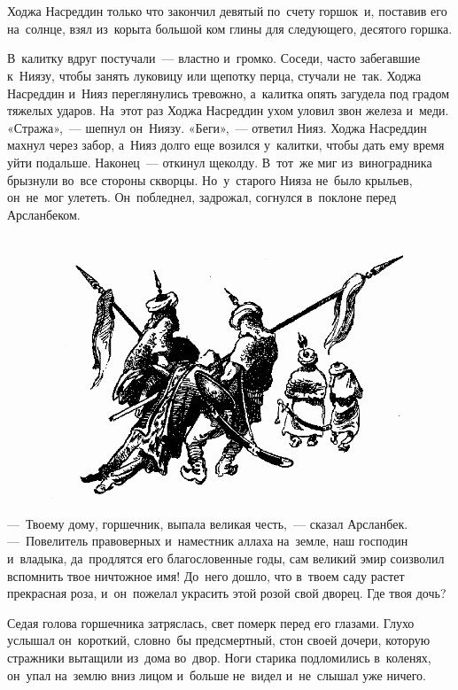 \documentclass[12pt,a4paper]{book}
\begin{document}
\chapter{}

Ходжа Насреддин только что закончил девятый по~счету горшок~и, поставив его на~солнце, взял из~корыта большой ком глины для следующего, десятого горшка.

В~калитку вдруг постучали~— властно и~громко. Соседи, часто забегавшие к~Ниязу, чтобы занять луковицу или щепотку перца, стучали не~так. Ходжа Насреддин и~Нияз переглянулись тревожно, а~калитка опять загудела под градом тяжелых ударов. На~этот раз Ходжа Насреддин ухом уловил звон железа и~меди. «Стража»,~— шепнул он~Ниязу. «Беги»,~— ответил Нияз. Ходжа Насреддин махнул через забор, а~Нияз долго еще возился у~калитки, чтобы дать ему время уйти подальше. Наконец~— откинул щеколду. В~тот~же миг из~виноградника брызнули во~все стороны скворцы. Но~у~старого Нияза не~было крыльев, он~не~мог улететь. Он~побледнел, задрожал, согнулся в~поклоне перед Арсланбеком.

\begin{figure}[h]
\centering
\includegraphics[width=\textwidth]{11.png}
\end{figure}

—~Твоему дому, горшечник, выпала великая честь,~— сказал Арсланбек. —~Повелитель правоверных и~наместник аллаха на~земле, наш господин и~владыка, да~продлятся его благословенные годы, сам великий эмир соизволил вспомнить твое ничтожное имя! До~него дошло, что в~твоем саду растет прекрасная роза, и~он~пожелал украсить этой розой свой дворец. Где твоя дочь?

Седая голова горшечника затряслась, свет померк перед его глазами. Глухо услышал он~короткий, словно~бы предсмертный, стон своей дочери, которую стражники вытащили из~дома во~двор. Ноги старика подломились в~коленях, он~упал на~землю вниз лицом и~больше не~видел и~не~слышал уже ничего.
\end{document}
